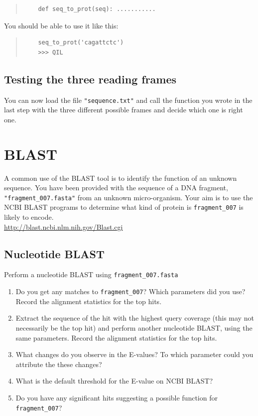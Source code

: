 \documentclass[a4paper,11pt]{article}
\begin{document}
\begin{quote}
\begin{verbatim}
	def seq_to_prot(seq): ...........
\end{verbatim}
\end{quote}

You should be able to use it like this:
\begin{quote}
\begin{verbatim}
	seq_to_prot('cagattctc')
	>>> QIL
\end{verbatim}
\end{quote}

\subsection{Testing the three reading frames}
You can now load the file \texttt{"sequence.txt"} and call the function you wrote in the last step with the three different possible frames and decide which one is right one.


\section{BLAST}
A common use of the BLAST tool is to identify the function of an unknown sequence. You have been provided with the sequence of a DNA fragment, \texttt{"fragment\_007.fasta"} from an unknown micro-organism. Your aim is to use the NCBI BLAST programs to determine what kind of protein is \texttt{fragment\_007} is likely to encode.\\

\url{http://blast.ncbi.nlm.nih.gov/Blast.cgi}

\subsection{Nucleotide BLAST}
Perform a nucleotide BLAST using \texttt{fragment\_007.fasta} 
\begin{enumerate}
\item Do you get any matches to \texttt{fragment\_007}? Which parameters did you use? Record the alignment statistics for the top hits.

\item Extract the sequence of the hit with the highest query coverage (this may not necessarily be the top hit) and perform another nucleotide BLAST, using the same parameters. Record the alignment statistics for the top hits.

\item What changes do you observe in the E-values? To which parameter could you attribute the these changes?  

\item What is the default threshold for the E-value on NCBI BLAST?

\item Do you have any significant hits suggesting a possible function for \texttt{fragment\_007}? 
\end{enumerate}
\end{document}
